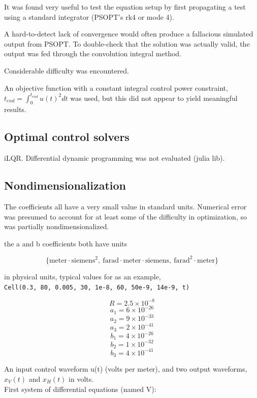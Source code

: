 \documentclass[fleqn,10pt]{paper}
\begin{document}
It was found very useful to test the equation setup by first propagating a test using a standard integrator (PSOPT's rk4 or mode 4).

A hard-to-detect lack of convergence would often produce a fallacious simulated output from PSOPT. To double-check that the solution was actually valid, the output was fed through the convolution integral method.

Considerable difficulty was encountered. 

An objective function with a constant integral control power constraint, $t_{end} = \int_0^{t_{end}} u(t)^2 dt$ was used, but this did not appear to yield meaningful results.

\subsection*{Optimal control solvers}




iLQR. Differential dynamic programming was not evaluated (julia lib).




\subsection*{Nondimensionalization}

The coefficients all have a very small value in standard units. Numerical error was presumed to account for at least some of the difficulty in optimization, so was partially nondimensionalized. 

the a and b coefficients both have units     

\[ \{\text{meter}\cdot \text{siemens}^2, \  \text{farad}\cdot \text{meter}\cdot \text{siemens} ,\ \text{farad}^2 \cdot \text{meter}\} \]

in physical units, typical values for as an example, \\
\verb|Cell(0.3, 80, 0.005, 30, 1e-8, 60, 50e-9, 14e-9, t)| \

$$R = 2.5\times10^{-8}$$
$$a_1 = 6\times10^{-26}$$
$$a_2 = 9\times10^{-33}$$
$$a_3 = 2\times10^{-41}$$
$$b_1 = 4\times10^{-26}$$
$$b_2 = 1\times10^{-32}$$
$$b_3 = 4\times10^{-41}$$

An input control waveform u(t) (volts per meter), and two output waveforms, $x_V(t)$ and $x_H(t)$ in volts.\\


First system of differential equations (named V):\\
\end{document}

